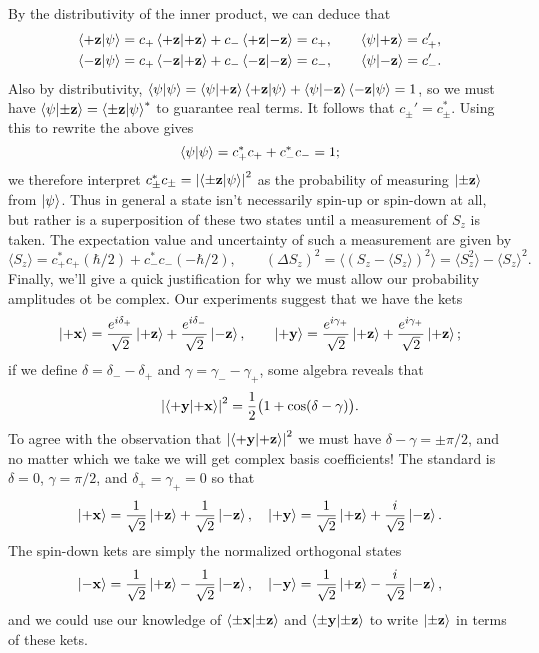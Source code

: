 \documentclass[../p116main.tex]{subfiles}
\begin{document}
By the distributivity of the inner product, we can deduce that
\begin{align*}
    \left< +\mathbf{z} \middle| \psi \right> &= c_+ \left< +\mathbf{z} \middle| +\mathbf{z} \right> + c_- \left< +\mathbf{z} \middle| -\mathbf{z} \right> = c_+, \qquad \left< \psi \middle| +\mathbf{z} \right> = c_+', \\
    \left< -\mathbf{z} \middle| \psi \right> &= c_+ \left< -\mathbf{z} \middle| +\mathbf{z} \right> + c_- \left< -\mathbf{z} \middle| -\mathbf{z} \right> = c_-, \qquad \left< \psi \middle| -\mathbf{z} \right> = c_-'.
\end{align*}
Also by distributivity, $\left< \psi \middle| \psi \right> = \left< \psi \middle| +\mathbf{z} \right> \left< +\mathbf{z} \middle| \psi \right> + \left< \psi \middle| -\mathbf{z} \right> \left< -\mathbf{z} \middle| \psi \right> = 1$, so we must have $\left< \psi \middle| \pm\mathbf{z} \right> = \left< \pm\mathbf{z} \middle| \psi \right>^*$ to guarantee real terms.
It follows that $c_\pm' = c_\pm^*$.
Using this to rewrite the above gives
\[ \left< \psi \middle| \psi \right> = c_+^* c_+ + c_-^* c_- = 1; \]
we therefore interpret $c_\pm^* c_\pm = \left| \left< \pm \mathbf{z} \middle| \psi \right> \right|^2$ as the probability of measuring $\left| \pm \mathbf{z} \right>$ from $\left| \psi \right>$.
Thus in general a state isn't necessarily spin-up or spin-down at all, but rather is a superposition of these two states until a measurement of $S_z$ is taken.
The expectation value and uncertainty of such a measurement are given by
\[ \langle S_z \rangle = c_+^* c_+ (\hbar / 2) + c_-^* c_- (-\hbar / 2), \qquad (\Delta S_z)^2 = \langle (S_z - \langle S_z \rangle)^2 \rangle = \langle S_z^2 \rangle - \langle S_z \rangle^2. \]
Finally, we'll give a quick justification for why we must allow our probability amplitudes ot be complex.
Our experiments suggest that we have the kets
\[ \left| +\mathbf{x} \right> = \frac{e^{i \delta_+}}{\sqrt{2}} \left| +\mathbf{z} \right> + \frac{e^{i \delta_-}}{\sqrt{2}} \left| -\mathbf{z} \right>, \qquad \left| +\mathbf{y} \right> = \frac{e^{i \gamma_+}}{\sqrt{2}} \left| +\mathbf{z} \right> + \frac{e^{i \gamma_+}}{\sqrt{2}} \left| +\mathbf{z} \right>; \]
if we define $\delta = \delta_- - \delta_+$ and $\gamma = \gamma_- - \gamma_+$, some algebra reveals that
\[ \left| \left< +\mathbf{y} \middle| +\mathbf{x} \right> \right|^2 = \frac{1}{2} \big( 1 + \cos(\delta - \gamma) \big). \]
To agree with the observation that $\left| \left< +\mathbf{y} \middle| +\mathbf{z} \right> \right|^2$ we must have $\delta - \gamma = \pm \pi / 2$, and no matter which we take we will get complex basis coefficients!
The standard is $\delta = 0$, $\gamma = \pi / 2$, and $\delta_+ = \gamma_+ = 0$ so that
\[ \left| +\mathbf{x} \right> = \frac{1}{\sqrt{2}} \left| +\mathbf{z} \right> + \frac{1}{\sqrt{2}} \left| -\mathbf{z} \right>, \quad \left| +\mathbf{y} \right> = \frac{1}{\sqrt{2}} \left| +\mathbf{z} \right> + \frac{i}{\sqrt{2}} \left| -\mathbf{z} \right>. \]
The spin-down kets are simply the normalized orthogonal states
\[ \left| -\mathbf{x} \right> = \frac{1}{\sqrt{2}} \left| +\mathbf{z} \right> - \frac{1}{\sqrt{2}} \left| -\mathbf{z} \right>, \quad \left| -\mathbf{y} \right> = \frac{1}{\sqrt{2}} \left| +\mathbf{z} \right> - \frac{i}{\sqrt{2}} \left| -\mathbf{z} \right>, \]
and we could use our knowledge of $\left< \pm \mathbf{x} \middle| \pm \mathbf{z} \right>$ and $\left< \pm \mathbf{y} \middle| \pm \mathbf{z} \right>$ to write $\left| \pm \mathbf{z} \right>$ in terms of these kets.
\end{document}
